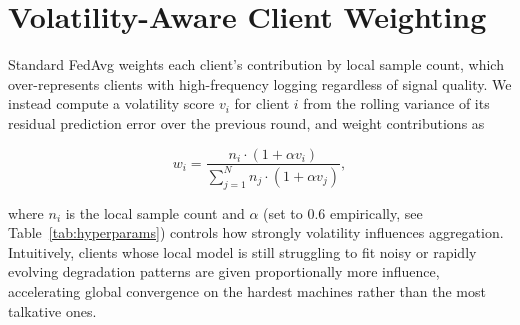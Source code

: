 \section{Volatility-Aware Client Weighting}
Standard FedAvg weights each client's contribution by local sample count, which
over-represents clients with high-frequency logging regardless of signal quality. We
instead compute a volatility score $v_i$ for client $i$ from the rolling variance of
its residual prediction error over the previous round, and weight contributions as

\[
w_i = \frac{n_i \cdot (1 + \alpha v_i)}{\sum_{j=1}^{N} n_j \cdot (1 + \alpha v_j)},
\]

where $n_i$ is the local sample count and $\alpha$ (set to 0.6 empirically, see
Table~\ref{tab:hyperparams}) controls how strongly volatility influences aggregation.
Intuitively, clients whose local model is still struggling to fit noisy or rapidly
evolving degradation patterns are given proportionally more influence, accelerating
global convergence on the hardest machines rather than the most talkative ones.
